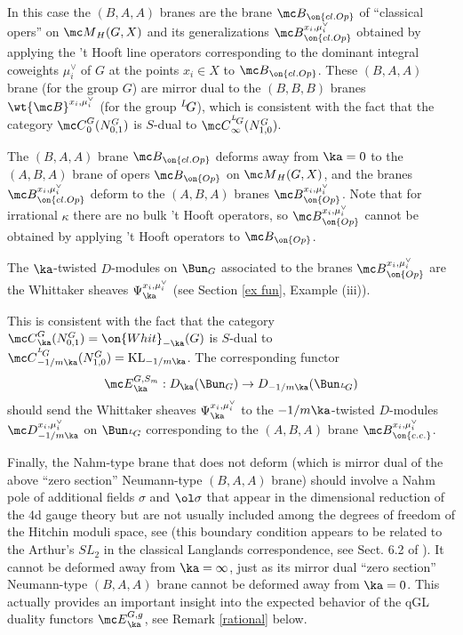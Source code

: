 \documentclass[11pt,reqno]{amsart}
\theoremstyle{plain}
\numberwithin{equation}{section}
\def\neg{\negthinspace}
\def\LG{{}^L\neg G}
\DeclareMathOperator{\KL}{KL}
\theoremstyle{definition}
\begin{document}
In this case the $(B,A,A)$ branes are the brane ${\mc B}_{\on{cl.Op}}$
of ``classical opers'' on ${\mc M}_H(G,X)$ and its generalizations
${\mc B}_{\on{cl.Op}}^{x_i,\mu^\vee_i}$ obtained by applying the 't
Hooft line operators corresponding to the dominant integral coweights
$\mu^\vee_i$ of $G$ at the points $x_i \in X$ to ${\mc
  B}_{\on{cl.Op}}$. These $(B,A,A)$ brane (for the group $G$) are
mirror dual to the $(B,B,B)$ branes $\wt{\mc B}^{x_i,\mu^\vee_i}$ (for
the group $\LG$), which is consistent with the fact that the category
${\mc C}^G_0(N^G_{0,1})$ is $S$-dual to ${\mc
  C}^{\LG}_\infty(N^G_{1,0})$.

The $(B,A,A)$ brane ${\mc B}_{\on{cl.Op}}$ deforms away from $\ka=0$
to the $(A,B,A)$ brane of opers ${\mc B}_{\on{Op}}$ on ${\mc
  M}_H(G,X)$, and the branes ${\mc B}_{\on{cl.Op}}^{x_i,\mu^\vee_i}$
deform to the $(A,B,A)$ branes ${\mc
  B}_{\on{Op}}^{x_i,\mu^\vee_i}$. Note that for irrational $\kappa$
there are no bulk 't Hooft operators, so ${\mc B}_{\on{Op}}^{x_i,\mu^\vee_i}$ 
cannot be obtained by applying 't Hooft operators to ${\mc B}_{\on{Op}}$.

The $\ka$-twisted $D$-modules on $\Bun_G$ associated to the branes
${\mc B}_{\on{Op}}^{x_i,\mu^\vee_i}$ are the Whittaker sheaves
$\Psi_\ka^{x_i,\mu^\vee_i}$ (see Section \ref{ex fun}, Example (iii)).

This is consistent with the fact that the category ${\mc
  C}^G_\ka(N^G_{0,1}) = \on{Whit}_{-\ka}(G)$ is $S$-dual to ${\mc
  C}^{\LG}_{-1/m\ka}(N^G_{1,0}) = \KL_{-1/m\ka}$. The corresponding
functor
$$
{\mc E}^{G,S_m}_\ka: D_\ka(\Bun_G) \to D_{-1/m\ka}(\Bun_{\LG})
$$
should send the Whittaker sheaves $\Psi_\ka^{x_i,\mu^\vee_i}$ to the
$-1/m\ka$-twisted $D$-modules ${\mc D}^{x_i,\mu^\vee_i}_{-1/m\ka}$ on
$\Bun_{\LG}$ corresponding to the $(A,B,A)$ brane ${\mc
  B}^{x_i,\mu^\vee_i}_{\on{c.c.}}$.

Finally, the Nahm-type brane that does not deform (which is mirror
dual of the above ``zero section'' Neumann-type $(B,A,A)$ brane)
should involve a Nahm pole of additional fields $\sigma$ and
$\ol\sigma$ that appear in the dimensional reduction of the 4d gauge
theory but are not usually included among the degrees of freedom of
the Hitchin moduli space, see \cite{KW,GW1,GW2} (this boundary
condition appears to be related to the Arthur's $SL_2$ in the
classical Langlands correspondence, see Sect. 6.2 of
\cite{F:bourbaki}). It cannot be deformed away from $\ka=\infty$, just
as its mirror dual ``zero section'' Neumann-type $(B,A,A)$ brane
cannot be deformed away from $\ka=0$. This actually provides an
important insight into the expected behavior of the qGL duality
functors ${\mc E}^{G,g}_\ka$, see Remark \ref{rational} below.
\end{document}
